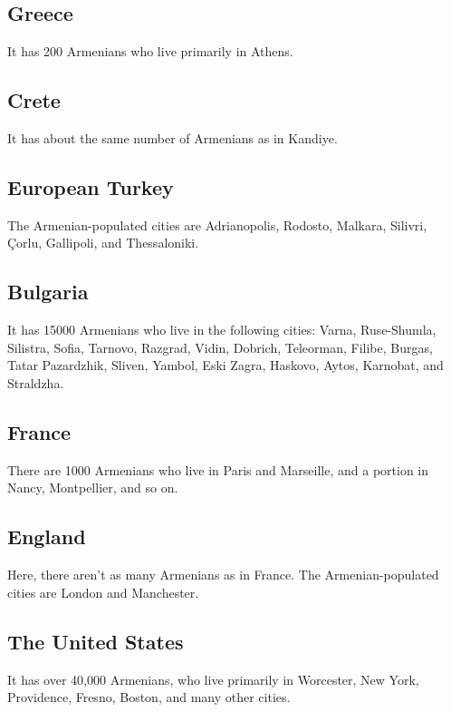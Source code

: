 \subsection{Greece}

It has 200 Armenians who live primarily in Athens.

\subsection{Crete}


It has about the same number of Armenians as in Kandiye. 

\subsection{European Turkey}

The Armenian-populated cities are Adrianopolis, Rodosto, Malkara, Silivri, Çorlu, Gallipoli, and Thessaloniki.

\subsection{Bulgaria}

It has 15000 Armenians who live in the following cities: Varna, Ruse-Shumla, Silistra, Sofia, Tarnovo, Razgrad, Vidin, Dobrich, Teleorman, Filibe, Burgas, Tatar Pazardzhik, Sliven, Yambol, Eski Zagra, Haskovo, Aytos, Karnobat, and Straldzha. 

\subsection{France}

There are 1000 Armenians who live in Paris and Marseille, and a portion in Nancy, Montpellier, and so on.

\subsection{England}

Here, there aren't as many Armenians as in France. The Armenian-populated cities are London and Manchester. 

\subsection{The United States}

It has over 40,000 Armenians, who live primarily in Worcester, New York, Providence, Fresno, Boston, and many other cities.

